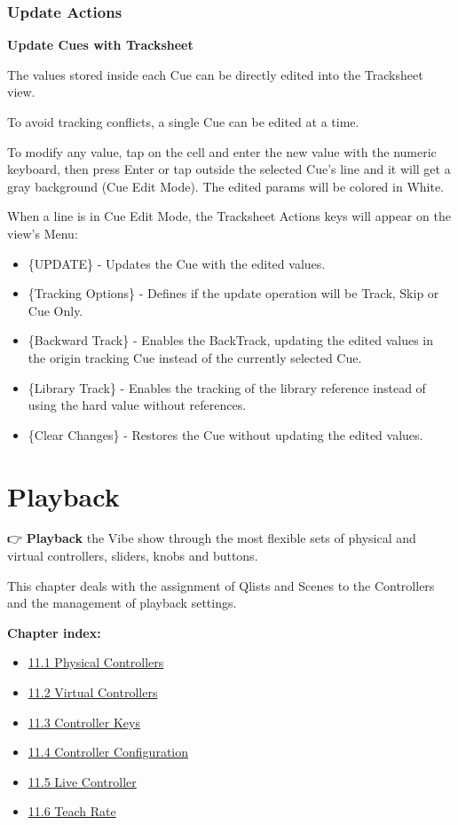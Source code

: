 \documentclass[
]{article}
\providecommand{\tightlist}{%
  \setlength{\itemsep}{0pt}\setlength{\parskip}{0pt}}
\begin{document}
\hypertarget{update-actions}{%
\subsubsection{Update Actions}\label{update-actions}}

\textbf{Update Cues with Tracksheet}

The values stored inside each Cue can be directly edited into the Tracksheet view.

To avoid tracking conflicts, a single Cue can be edited at a time.

To modify any value, tap on the cell and enter the new value with the numeric keyboard, then press Enter or tap outside the selected Cue's line and it will get a gray background (Cue Edit Mode). The edited params will be colored in White.

When a line is in Cue Edit Mode, the Tracksheet Actions keys will appear on the view's Menu:

\begin{itemize}
\item
  \{UPDATE\} - Updates the Cue with the edited values.
\item
  \{Tracking Options\} - Defines if the update operation will be Track, Skip or Cue Only.
\item
  \{Backward Track\} - Enables the BackTrack, updating the edited values in the origin tracking Cue instead of the currently selected Cue.
\item
  \{Library Track\} - Enables the tracking of the library reference instead of using the hard value without references.
\item
  \{Clear Changes\} - Restores the Cue without updating the edited values.
\end{itemize}

\hypertarget{playback}{%
\section{Playback}\label{playback}}

👉 \textbf{Playback} the Vibe show through the most flexible sets of physical and virtual controllers, sliders, knobs and buttons.

This chapter deals with the assignment of Qlists and Scenes to the Controllers and the management of playback settings.

\textbf{Chapter index:}

\begin{itemize}
\tightlist
\item
  \protect\hyperlink{Physical-Controllers-11.1}{11.1 Physical Controllers}
\item
  \protect\hyperlink{Virtual-Controllers-11.2}{11.2 Virtual Controllers}
\item
  \protect\hyperlink{Controller-Keys-11.3}{11.3 Controller Keys}
\item
  \protect\hyperlink{Controller-Configuration-11.4}{11.4 Controller Configuration}
\item
  \protect\hyperlink{Live-Controller-11.5}{11.5 Live Controller}
\item
  \protect\hyperlink{Teach-Rate-11.6}{11.6 Teach Rate}
\end{itemize}
\end{document}
